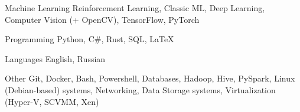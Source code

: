 

\begin{cvskills}

  \cvskill
    {Machine Learning} %
    {Reinforcement Learning, Classic ML, Deep Learning, Computer Vision (+ OpenCV), TensorFlow, PyTorch} %

  \cvskill
    {Programming} %
    {Python, C\#, Rust, SQL, LaTeX} %

  \cvskill
    {Languages} %
    {English, Russian} %

  \cvskill
	{Other} %
	{Git, Docker, Bash, Powershell, Databases, Hadoop, Hive, PySpark, Linux (Debian-based) systems, Networking, Data Storage systems, Virtualization (Hyper-V, SCVMM, Xen)} %

\end{cvskills}
